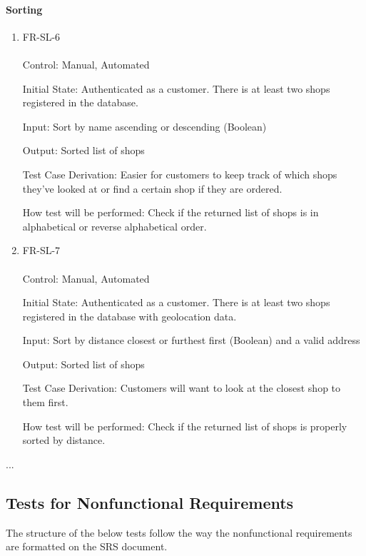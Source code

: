 \documentclass[12pt, titlepage]{article}
\begin{document}
    \paragraph{Sorting}
        \begin{enumerate}
            \item{FR-SL-6} \\ \\
                Control: Manual, Automated \par
                Initial State: Authenticated as a customer. There is at least two shops registered in the database. \par
                Input: Sort by name ascending or descending (Boolean)\par
                Output: Sorted list of shops\par
                Test Case Derivation: Easier for customers to keep track of which shops they've looked at or find a certain shop if they are ordered.\par
                How test will be performed: Check if the returned list of shops is in alphabetical or reverse alphabetical order.\par
            \item{FR-SL-7} \\ \\
                Control: Manual, Automated \par
                Initial State: Authenticated as a customer. There is at least two shops registered in the database with geolocation data.\par
                Input: Sort by distance closest or furthest first (Boolean) and a valid address \par
                Output: Sorted list of shops \par
                Test Case Derivation: Customers will want to look at the closest shop to them first. \par
                How test will be performed: Check if the returned list of shops is properly sorted by distance. \par
        \end{enumerate}
        
...

\subsection{Tests for Nonfunctional Requirements}

The structure of the below tests follow the way the nonfunctional requirements are formatted on the SRS document.
\end{document}
